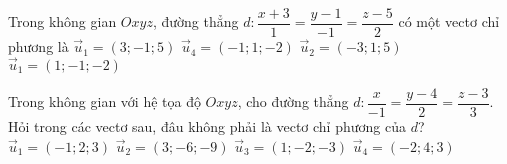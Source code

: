 \begin{ex}%
	Trong không gian $Oxyz$, đường thẳng $d:\dfrac{x+3}{1}=\dfrac{y-1}{-1}=\dfrac{z-5}{2}$ có một vectơ chỉ phương là
	\choice
		{$\overrightarrow{u}_1=\left(3;-1; 5\right)$}
		{\True $\overrightarrow{u}_4=\left(-1; 1;-2\right)$}
		{$\overrightarrow{u}_2=\left(-3; 1; 5\right)$}
		{$\overrightarrow{u}_1=\left(1;-1;-2\right)$}
\end{ex}

\begin{ex}%
	Trong không gian với hệ tọa độ $Oxyz$, cho đường thẳng $d:\dfrac{x}{-1}=\dfrac{y-4}{2}=\dfrac{z-3}{3}$. Hỏi trong các vectơ sau, đâu không phải là vectơ chỉ phương của $d$?
	\choice
		{$\overrightarrow{u}_1=\left(-1;2;3\right)$}
		{$\overrightarrow{u}_2=\left(3;-6;-9\right)$}
		{$\overrightarrow{u}_3=\left(1;-2;-3\right)$}
		{\True $\overrightarrow{u}_4=\left(-2;4;3\right)$}
\end{ex}
 

 

